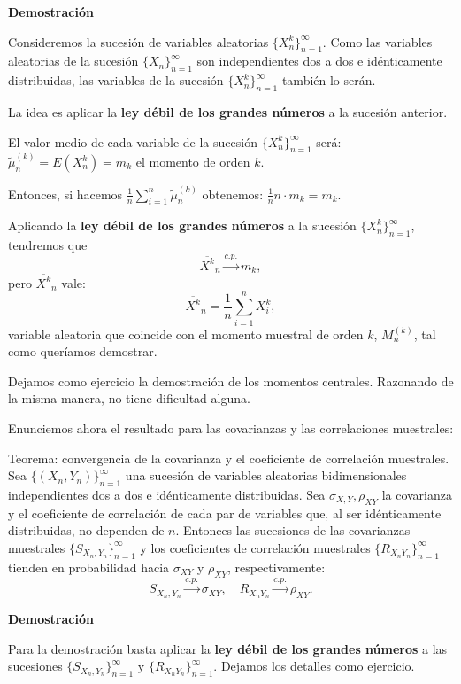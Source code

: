 \documentclass[]{book}
\begin{document}
\textbf{Demostración}

Consideremos la sucesión de variables aleatorias \(\{X_n^k\}_{n=1}^\infty\). Como las variables aleatorias de la sucesión \(\{X_n\}_{n=1}^\infty\) son independientes dos a dos e idénticamente distribuidas, las variables de la sucesión \(\{X_n^k\}_{n=1}^\infty\) también lo serán.

La idea es aplicar la \textbf{ley débil de los grandes números} a la sucesión anterior.

El valor medio de cada variable de la sucesión \(\{X_n^k\}_{n=1}^\infty\) será: \(\tilde{\mu}_n^{(k)}= E(X_n^{k})=m_k\) el momento de orden \(k\).

Entonces, si hacemos \(\frac{1}{n}\sum\limits_{i=1}^n \tilde{\mu}_n^{(k)}\) obtenemos:
\(\frac{1}{n} n\cdot m_k=m_k.\)

Aplicando la \textbf{ley débil de los grandes números} a la sucesión \(\{X_n^k\}_{n=1}^\infty\), tendremos que
\[
\overline{X^k}_n \stackrel{c.p.}{\longrightarrow}m_k,
\]
pero \(\overline{X^k}_n\) vale:
\[
\overline{X^k}_n=\frac{1}{n}\sum_{i=1}^n X_i^k,
\]
variable aleatoria que coincide con el momento muestral de orden \(k\), \(M_n^{(k)}\), tal como queríamos demostrar.

Dejamos como ejercicio la demostración de los momentos centrales. Razonando de la misma manera, no tiene dificultad alguna.

Enunciemos ahora el resultado para las covarianzas y las correlaciones muestrales:

 Teorema: convergencia de la covarianza y el coeficiente de correlación muestrales.
Sea \(\{(X_n,Y_n)\}_{n=1}^\infty\) una sucesión de variables aleatorias bidimensionales independientes dos a dos e idénticamente distribuidas.
Sea \(\sigma_{X,Y}, \rho_{XY}\) la covarianza y el coeficiente de correlación de cada par de variables que, al ser idénticamente distribuidas, no dependen de \(n\). Entonces las sucesiones de las covarianzas muestrales \(\{S_{X_n,Y_n}\}_{n=1}^\infty\) y los coeficientes de correlación muestrales \(\{R_{X_nY_n}\}_{n=1}^\infty\) tienden en probabilidad hacia \(\sigma_{XY}\) y \(\rho_{XY}\), respectivamente:
\[
S_{X_n,Y_n}\stackrel{c.p.}{\longrightarrow}\sigma_{XY},\quad R_{X_nY_n}\stackrel{c.p.}{\longrightarrow}\rho_{XY}.
\]

\textbf{Demostración}

Para la demostración basta aplicar la \textbf{ley débil de los grandes números} a las sucesiones \(\{S_{X_n,Y_n}\}_{n=1}^\infty\) y \(\{R_{X_nY_n}\}_{n=1}^\infty\). Dejamos los detalles como ejercicio.
\end{document}
